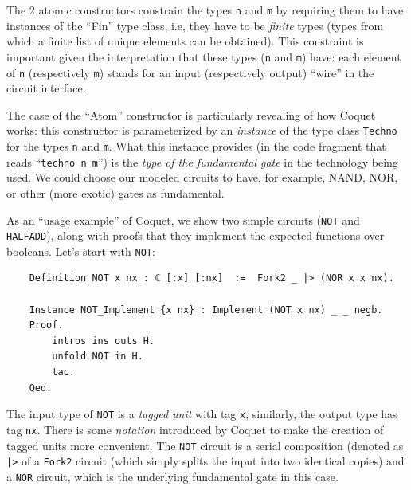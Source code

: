 \documentclass[a4paper]{article}
\begin{document}
                The 2 atomic constructors constrain the types \texttt{n} and \texttt{m} by requiring
                them to have instances of the ``Fin'' type class, i.e, they have to be \emph{finite}
                types (types from which a finite list of unique elements can be obtained). This
                constraint is important given the interpretation that these types (\texttt{n} and
                \texttt{m}) have: each element of \texttt{n} (respectively \texttt{m}) stands for an
                input (respectively output) ``wire'' in the circuit interface.

                The case of the ``Atom'' constructor is particularly revealing of how Coquet works:
                this constructor is parameterized by an \emph{instance} of the type class
                \texttt{Techno} for the types \texttt{n} and \texttt{m}. What this instance provides
                (in the code fragment that reads ``\texttt{techno n m}'') is the \emph{type of the
                    fundamental gate} in the technology being used. We could choose our modeled
                circuits to have, for example, NAND, NOR, or other (more exotic) gates as
                fundamental.

                As an ``usage example'' of Coquet, we show two simple circuits (\texttt{NOT} and
                \texttt{HALFADD}), along with proofs that they implement the expected functions over
                booleans. Let's start with \texttt{NOT}:
                \begin{verbatim}
    Definition NOT x nx : ℂ [:x] [:nx]  :=  Fork2 _ |> (NOR x x nx).

    Instance NOT_Implement {x nx} : Implement (NOT x nx) _ _ negb.
    Proof.
        intros ins outs H.
        unfold NOT in H.
        tac.
    Qed.
                \end{verbatim}

                The input type of \texttt{NOT} is a \emph{tagged unit} with tag \texttt{x},
                similarly, the output type has tag \texttt{nx}. There is some \emph{notation}
                introduced by Coquet to make the creation of tagged units more convenient. The
                \texttt{NOT} circuit is a serial composition (denoted as \texttt{|>} of a
                \texttt{Fork2} circuit (which simply splits the input into two identical copies) and
                a \texttt{NOR} circuit, which is the underlying fundamental gate in this case.
\end{document}
